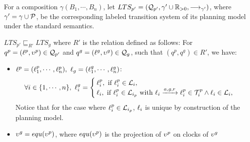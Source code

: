 For a composition $\gamma(B_1,\cdots,B_n)$, let $LTS_{p'}=(\mathcal{Q}_{p'},\gamma'\cup\mathbb{R}_{> 0},
\longrightarrow_{\gamma'})$, where $\gamma'=\gamma\cup\mathcal{P}$, be the corresponding labeled transition 
system of its planning model under the 
standard semantics.  
\begin{theorem}\label{correctness}
  $LTS_{p'}\sqsubseteq_{R'} LTS_g$ where $R'$ is the relation defined as follows:
  For $q^p=(\ell^p,\upsilon^p)\in\mathcal{Q}_{p'}$ and $q^g=(\ell^g,\upsilon^g)\in\mathcal{Q}_g$, such that $(q^p,q^g)\in 
  R'$, we have: 

  \begin{itemize}
    \item $\loc^p=(\loc^p_1,\cdots,\loc^p_n),\ \loc_g=(\loc^g_1,\cdots,\loc^g_n)$:
      \[\forall i\in\{1,\cdots,n\},\ \loc^g_i=\begin{cases}
        \loc^p_i, \text{ if } \loc^p_i\in\Loc_i,\\
        \loc_i, \text{ if } \loc^p_i\in\Loc_{i_p}\text{ with }\loc_i\transit{a,g,r}\loc_i^p\in
        \T_i^p\wedge\loc_i\in\Loc_i,
    \end{cases} 
      \]
      Notice that for the case where $\ell_i^p\in\mathcal{L}_{i_p}$, $\ell_i$ is unique by 
      construction of the planning model.
    \item $\upsilon^g=equ(\upsilon^p)$, where $equ(\upsilon^p)$ is the projection of $\upsilon^p$ on clocks of 
      $\upsilon^g$ 
  \end{itemize}
 
  \end{theorem}
